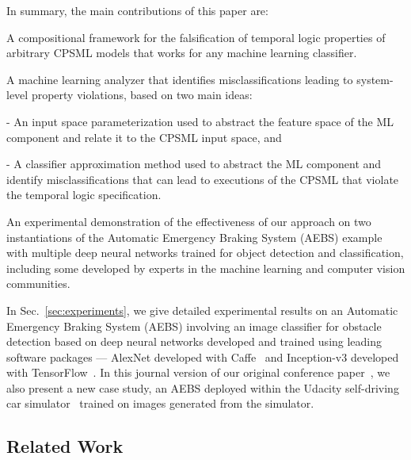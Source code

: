 In summary, the main contributions of this paper are:
\begin{myitemize}

\item A compositional framework for
the falsification of temporal logic properties of arbitrary 
CPSML models that works for any machine learning classifier.

\item A machine learning analyzer that identifies
misclassifications leading to system-level property violations, 
based on two main ideas:
\begin{myitemize}
	\item[-] An input space parameterization used to abstract the feature space of the ML component and relate it
		to the CPSML input space, and
	\item[-] A classifier approximation method used to abstract
the ML component and identify misclassifications that can 
lead to executions of the CPSML that violate the temporal logic specification.
\end{myitemize}

\item
An experimental demonstration of the effectiveness of our approach 
on two instantiations of the Automatic Emergency Braking System (AEBS)
example with multiple deep neural networks trained for object
detection and classification, including some developed by experts
in the machine learning and computer vision communities.
\end{myitemize}
In Sec.~\ref{sec:experiments}, we give detailed experimental results
on an Automatic Emergency Braking System (AEBS)
involving an image classifier for obstacle detection
based on deep neural networks developed and trained
using leading software packages --- 
AlexNet developed with Caffe~\cite{jia2014caffe} 
and Inception-v3 developed with TensorFlow~\cite{tensorflow2015}. 
In this journal version of our original conference paper~\cite{dreossi-nfm17},
we also present a new case study, an AEBS deployed within 
the Udacity self-driving car simulator~\cite{udacitySim-www} trained
on images generated from the simulator.


\subsection*{Related Work}

